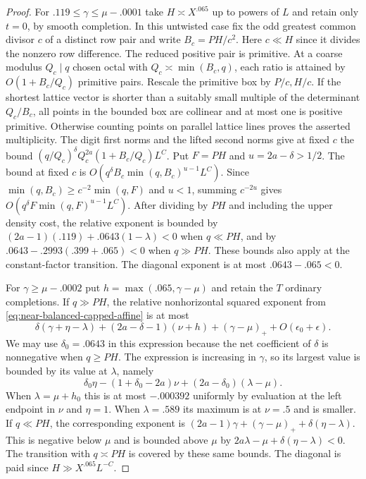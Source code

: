 \documentclass[11pt,a4paper]{article}
\theoremstyle{paperplain}
\numberwithin{equation}{section}
\begin{document}
\begin{proof}
For $.119\le\gamma\le\mu-.0001$ take $H\asymp X^{.065}$ up to powers of $L$
and retain only $t=0$, by smooth completion. In this untwisted
case fix the odd greatest common divisor $c$ of a distinct row
pair and write $B_c=PH/c^2$. Here $c\ll H$ since it
divides the nonzero row difference. The reduced positive pair is
primitive. At a coarse modulus $Q_c\mid q$ chosen octal with
$Q_c\asymp\min(B_c,q)$, each ratio is attained by
$O(1+B_c/Q_c)$ primitive pairs. Rescale the primitive box
by $P/c,H/c$. If the shortest lattice vector is shorter than
a suitably small multiple of the determinant $Q_c/B_c$,
all points in the bounded box are collinear and at most one
is positive primitive. Otherwise counting points on parallel
lattice lines proves the asserted multiplicity. The digit
first norms and the lifted second norms give at fixed $c$
the bound $(q/Q_c)^\delta Q_c^{2a}(1+B_c/Q_c)L^C$.
Put $F=PH$ and $u=2a-\delta>1/2$. The bound at fixed $c$ is
$O(q^\delta B_c\min(q,B_c)^{u-1}L^C)$.
Since $\min(q,B_c)\ge c^{-2}\min(q,F)$ and $u<1$, summing $c^{-2u}$
gives $O(q^\delta F\min(q,F)^{u-1}L^C)$.
After dividing by $PH$ and including the upper density cost, the
relative exponent is bounded by $(2a-1)(.119)+.0643(1-\lambda)<0$
when $q\ll PH$, and by $.0643-.2993(.399+.065)<0$ when $q\gg PH$.
These bounds also apply at the constant-factor transition.
The diagonal exponent is at most $.0643-.065<0$.

For $\gamma\ge\mu-.0002$ put $h=\max(.065,\gamma-\mu)$
and retain the $T$ ordinary completions. If $q\gg PH$, the
relative nonhorizontal squared exponent from
\eqref{eq:near-balanced-capped-affine} is at most
\begin{equation}\label{eq:near-balanced-nonhorizontal-exponent}
 \delta(\gamma+\eta-\lambda)
        +(2a-\delta-1)(\nu+h)+(\gamma-\mu)_++O(\epsilon_0+\epsilon).
\end{equation}
We may use $\delta_0=.0643$ in this expression because the
net coefficient of $\delta$ is nonnegative when $q\ge PH$.
The expression is increasing in $\gamma$, so its largest
value is bounded by its value at $\lambda$, namely
\[
 \delta_0\eta-(1+\delta_0-2a)\nu+(2a-\delta_0)(\lambda-\mu).
\]
When $\lambda=\mu+h_0$ this is at most $-.000392$ uniformly
by evaluation at the left endpoint in $\nu$ and $\eta=1$. When $\lambda=.589$ its
maximum is at $\nu=.5$ and is smaller. If $q\ll PH$, the
corresponding exponent is
$(2a-1)\gamma+(\gamma-\mu)_++\delta(\eta-\lambda)$.
This is negative below $\mu$ and is bounded above $\mu$
by $2a\lambda-\mu+\delta(\eta-\lambda)<0$.
The transition with $q\asymp PH$ is covered by these
same bounds. The diagonal is paid since $H\gg X^{.065}L^{-C}$.


\end{proof}
\end{document}
